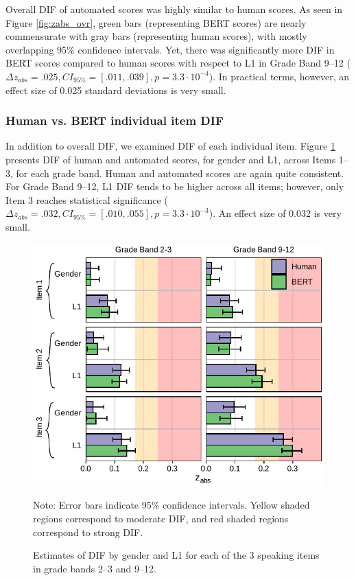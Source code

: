 \documentclass [PhD] {uclathes}
\begin{document}
Overall DIF of automated scores was highly similar to human scores. As seen in Figure \ref{fig:zabs_ovr}, green bars (representing BERT scores) are nearly commensurate with gray bars (representing human scores), with mostly overlapping 95\% confidence intervals. Yet, there was significantly more DIF in BERT scores compared to human scores with respect to L1 in Grade Band 9–12 ($\Delta z_{abs} = .025, CI_{95\%} = [.011, .039], p = 3.3 \cdot 10^{-4}$). In practical terms, however, an effect size of 0.025 standard deviations is very small. 

\subsubsection{Human vs. BERT individual item DIF}

In addition to overall DIF, we examined DIF of each individual item. Figure \ref{fig:zabs_itm} presents DIF of human and automated scores, for gender and L1, across Items 1–3, for each grade band. Human and automated scores are again quite consistent. For Grade Band 9–12, L1 DIF tends to be higher across all items; however, only Item 3 reaches statistical significance ($\Delta z_{abs} = .032, CI_{95\%} = [.010, .055], p = 3.3 \cdot 10^{-3}$). An effect size of 0.032 is very small.

\begin{figure}[h]
    \centering
    \caption{Estimates of DIF by gender and L1 for each of the 3 speaking items in grade bands 2–3 and 9–12.}    
    \includegraphics[width=5in]{figures/20230504_ETS-DIF_BERT_zabs_itm_edit.pdf}
    \label{fig:zabs_itm}
	{\newline Note: Error bars indicate 95\% confidence intervals. Yellow shaded regions correspond to moderate DIF, and red shaded regions correspond to strong DIF. \par}
\end{figure}
\end{document}
